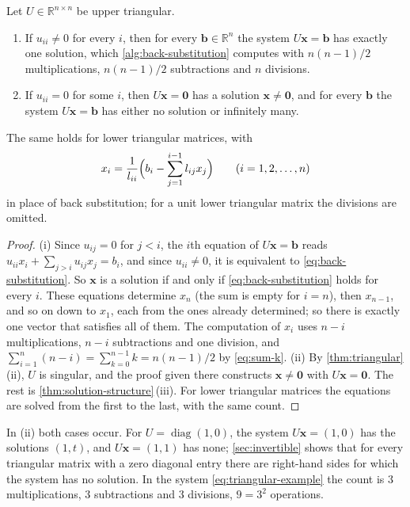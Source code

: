 \begin{proposition}
\label{prop:triangular-solve}
Let $U\in\mathbb R^{n\times n}$ be upper triangular.
\begin{enumerate}
\item If $u_{ii}\ne0$ for every $i$, then for every $\mathbf b\in\mathbb R^n$ the system $U\mathbf x=\mathbf b$ has exactly one solution, which \cref{alg:back-substitution} computes with $n(n-1)/2$ multiplications, $n(n-1)/2$ subtractions and $n$ divisions.
\item If $u_{ii}=0$ for some $i$, then $U\mathbf x=\mathbf 0$ has a solution $\mathbf x\ne\mathbf 0$, and for every $\mathbf b$ the system $U\mathbf x=\mathbf b$ has either no solution or infinitely many.
\end{enumerate}
The same holds for lower triangular matrices, with 
\[
x_i=\frac1{l_{ii}}\Bigl(b_i-\sum_{j=1}^{i-1}l_{ij}x_j\Bigr)\qquad(i=1,2,\ldots,n)
\]
in place of back substitution; for a unit lower triangular matrix the divisions are omitted.
\end{proposition}

\begin{proof}
(i) Since $u_{ij}=0$ for $j<i$, the $i$th equation of $U\mathbf x=\mathbf b$ reads $u_{ii}x_i+\sum_{j>i}u_{ij}x_j=b_i$, and since $u_{ii}\ne0$, it is equivalent to \eqref{eq:back-substitution}. So $\mathbf x$ is a solution if and only if \eqref{eq:back-substitution} holds for every $i$. These equations determine $x_n$ (the sum is empty for $i=n$), then $x_{n-1}$, and so on down to $x_1$, each from the ones already determined; so there is exactly one vector that satisfies all of them. The computation of $x_i$ uses $n-i$ multiplications, $n-i$ subtractions and one division, and $\sum_{i=1}^n(n-i)=\sum_{k=0}^{n-1}k=n(n-1)/2$ by \eqref{eq:sum-k}. (ii) By \cref{thm:triangular}\,(ii), $U$ is singular, and the proof given there constructs $\mathbf x\ne\mathbf 0$ with $U\mathbf x=\mathbf 0$. The rest is \cref{thm:solution-structure}\,(iii). For lower triangular matrices the equations are solved from the first to the last, with the same count.
\end{proof}

In (ii) both cases occur. For $U=\operatorname{diag}(1,0)$, the system $U\mathbf x=(1,0)$ has the solutions $(1,t)$, and $U\mathbf x=(1,1)$ has none; \cref{sec:invertible} shows that for every triangular matrix with a zero diagonal entry there are right-hand sides for which the system has no solution. In the system \eqref{eq:triangular-example} the count is $3$ multiplications, $3$ subtractions and $3$ divisions, $9=3^2$ operations.

